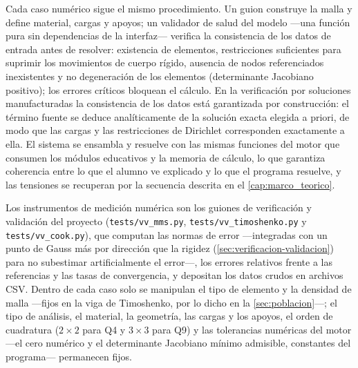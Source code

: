 Cada caso numérico sigue el mismo procedimiento. Un guion construye la malla y define material, cargas y apoyos; un validador de salud del modelo —una función pura sin dependencias de la interfaz— verifica la consistencia de los datos de entrada antes de resolver: existencia de elementos, restricciones suficientes para suprimir los movimientos de cuerpo rígido, ausencia de nodos referenciados inexistentes y no degeneración de los elementos (determinante Jacobiano positivo); los errores críticos bloquean el cálculo. En la verificación por soluciones manufacturadas la consistencia de los datos está garantizada por construcción: el término fuente se deduce analíticamente de la solución exacta elegida a priori, de modo que las cargas y las restricciones de Dirichlet corresponden exactamente a ella. El sistema se ensambla y resuelve con las mismas funciones del motor que consumen los módulos educativos y la memoria de cálculo, lo que garantiza coherencia entre lo que el alumno ve explicado y lo que el programa resuelve, y las tensiones se recuperan por la secuencia descrita en el \autoref{cap:marco_teorico}.

Los instrumentos de medición numérica son los guiones de verificación y validación del proyecto (\texttt{tests/vv\_mms.py}, \texttt{tests/vv\_timoshenko.py} y \texttt{tests/vv\_cook.py}), que computan las normas de error —integradas con un punto de Gauss más por dirección que la rigidez (\autoref{sec:verificacion-validacion}) para no subestimar artificialmente el error—, los errores relativos frente a las referencias y las tasas de convergencia, y depositan los datos crudos en archivos CSV. Dentro de cada caso solo se manipulan el tipo de elemento y la densidad de malla —fijos en la viga de Timoshenko, por lo dicho en la \autoref{sec:poblacion}—; el tipo de análisis, el material, la geometría, las cargas y los apoyos, el orden de cuadratura ($2\times2$ para Q4 y $3\times3$ para Q9) y las tolerancias numéricas del motor —el cero numérico y el determinante Jacobiano mínimo admisible, constantes del programa— permanecen fijos.

